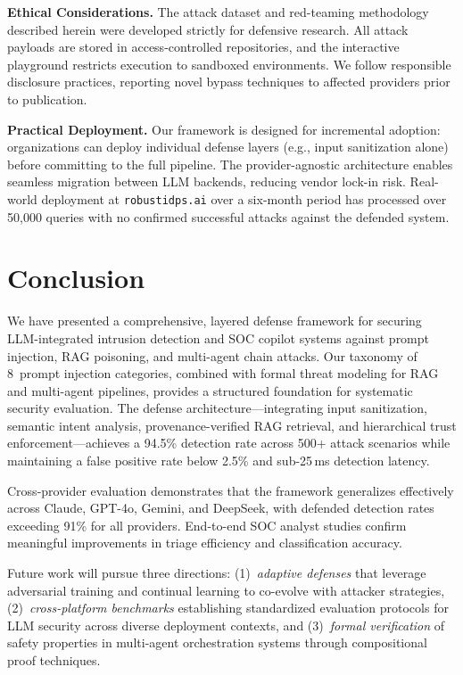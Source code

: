 \textbf{Ethical Considerations.} The attack dataset and red-teaming methodology described herein were developed strictly for defensive research. All attack payloads are stored in access-controlled repositories, and the interactive playground restricts execution to sandboxed environments. We follow responsible disclosure practices, reporting novel bypass techniques to affected providers prior to publication.

\textbf{Practical Deployment.} Our framework is designed for incremental adoption: organizations can deploy individual defense layers (e.g., input sanitization alone) before committing to the full pipeline. The provider-agnostic architecture enables seamless migration between LLM backends, reducing vendor lock-in risk. Real-world deployment at \texttt{robustidps.ai} over a six-month period has processed over 50{,}000 queries with no confirmed successful attacks against the defended system.

\section{Conclusion}\label{sec:conclusion}

We have presented a comprehensive, layered defense framework for securing LLM-integrated intrusion detection and SOC copilot systems against prompt injection, RAG poisoning, and multi-agent chain attacks. Our taxonomy of 8~prompt injection categories, combined with formal threat modeling for RAG and multi-agent pipelines, provides a structured foundation for systematic security evaluation. The defense architecture---integrating input sanitization, semantic intent analysis, provenance-verified RAG retrieval, and hierarchical trust enforcement---achieves a 94.5\% detection rate across 500+ attack scenarios while maintaining a false positive rate below 2.5\% and sub-25\,ms detection latency.

Cross-provider evaluation demonstrates that the framework generalizes effectively across Claude, GPT-4o, Gemini, and DeepSeek, with defended detection rates exceeding 91\% for all providers. End-to-end SOC analyst studies confirm meaningful improvements in triage efficiency and classification accuracy.

Future work will pursue three directions: (1)~\emph{adaptive defenses} that leverage adversarial training and continual learning to co-evolve with attacker strategies, (2)~\emph{cross-platform benchmarks} establishing standardized evaluation protocols for LLM security across diverse deployment contexts, and (3)~\emph{formal verification} of safety properties in multi-agent orchestration systems through compositional proof techniques.

